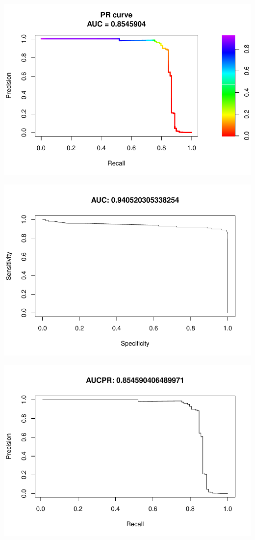 \documentclass[]{article}
\begin{document}
\begin{center}\includegraphics{Credit_Card_Fraud_Detection_Project_Report_files/figure-latex/unnamed-chunk-25-24} \end{center}

\begin{center}\includegraphics{Credit_Card_Fraud_Detection_Project_Report_files/figure-latex/unnamed-chunk-25-25} \end{center}

\begin{center}\includegraphics{Credit_Card_Fraud_Detection_Project_Report_files/figure-latex/unnamed-chunk-25-26} \end{center}
\end{document}
